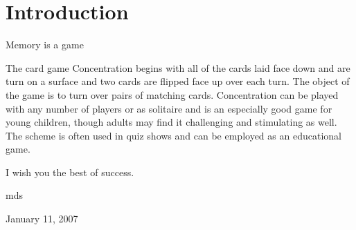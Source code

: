 \section{Introduction}

Memory is a game

The card game Concentration begins with all of the cards laid face down and are turn on a surface and two cards are flipped face up over each turn. The object of the game is to turn over pairs of matching cards. Concentration can be played with any number of players or as solitaire and is an especially good game for young children, though adults may find it challenging and stimulating as well. The scheme is often used in quiz shows and can be employed as an educational game.

I wish you the best of success.

\hfill mds

\hfill January 11, 2007